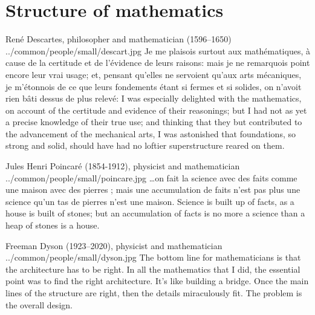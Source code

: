 \section*{Structure of mathematics}
\qboxnpqt
  {Ren\'e Descartes, philosopher and mathematician (1596--1650)
   \footnotemark}
  {../common/people/small/descart.jpg}
  {Je me plaisois surtout aux math\'ematiques,
    \`a cause de la certitude et de l'\'evidence de leurs raisons:
    mais je ne remarquois point encore leur vrai usage;
    et, pensant qu'elles ne servoient qu'aux arts m\'ecaniques,
    je m'\'etonnois de ce que leurs fondements \'etant si fermes et si solides,
    on n'avoit rien b\^ati dessus de plus relev\'e:}
  {I was especially delighted with the mathematics,
    on account of the certitude and evidence of their reasonings;
    but I had not as yet a precise knowledge of their true use;
    and thinking that they but contributed to the advancement of the mechanical arts,
    I was astonished that foundations, so strong and solid,
    should have had no loftier superstructure reared on them.}

\qboxnpqt
  { Jules Henri Poincar\'e (1854-1912), physicist and mathematician
    \footnotemark
  }
  {../common/people/small/poincare.jpg}
  {\ldots on fait la science avec des faits comme une maison avec des pierres ;
   mais une accumulation de faits n'est pas plus une science qu'un tas de
   pierres n'est une maison.}
  {Science is built up of facts, as a house is built of stones;
   but an accumulation of facts is no more a science than a heap of stones is a house.}


\qboxnps
  {
    Freeman Dyson (1923--2020), physicist and mathematician  %
    \footnotemark
  }
  {../common/people/small/dyson.jpg}
  {The bottom line for mathematicians is that the architecture has to be right.
    In all the mathematics that I did, the essential point was to find
    the right architecture.
    It's like building a bridge.
    Once the main lines of the structure are right,
    then the details miraculously fit.
    The problem is the overall design.}

